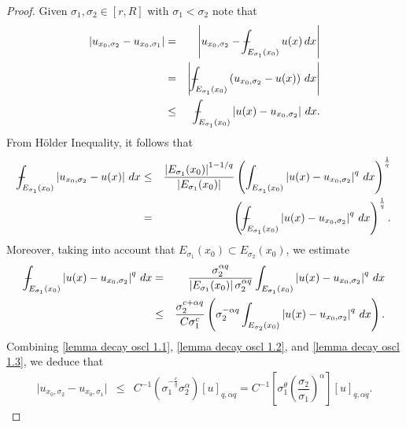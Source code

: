 \documentclass[10pt, leqno]{article}
\def\Xint#1{\mathchoice
{\XXint\displaystyle\textstyle{#1}}
{\XXint\textstyle\scriptstyle{#1}}
{\XXint\scriptstyle\scriptscriptstyle{#1}}
{\XXint\scriptscriptstyle\scriptscriptstyle{#1}}
\!\int}
\def\XXint#1#2#3{{\setbox0=\hbox{$#1{#2#3}{\int}$ }
\vcenter{\hbox{$#2#3$ }}\kern-.6\wd0}}
\def\dashint{\Xint-}
\theoremstyle{definition}
\theoremstyle{remark}
\numberwithin{equation}{section}
\begin{document}
\begin{proof}
Given $\sigma_{1}, \sigma_{2} \in \left [r, R \right]$ with $\sigma_{1} < \sigma_{2}$ note that
\begin{eqnarray}
\label{lemma decay oscl 1.1}
\vert u_{x_{0}, \sigma_{2}} - u_{x_{0}, \sigma_{1}} \vert & = & \nonumber \left | u_{x_{0}, \sigma_{2}} - \displaystyle \dashint_{E_{\sigma_{1}}(x_{0})}u(x)\, dx  \right | \\ \nonumber
& = & \left |  \displaystyle \dashint_{E_{\sigma_{1}}(x_{0})} \left( u_{x_{0}, \sigma_{2}} - u(x) \right) \, dx  \right | \\
& \leq & \displaystyle \dashint_{E_{\sigma_{1}}(x_{0})} \left| u(x) - u_{x_{0}, \sigma_{2}} \right| \, dx.
\end{eqnarray}
From H\" older Inequality, it follows that
\begin{eqnarray}
\label{lemma decay oscl 1.2}
\displaystyle \dashint_{E_{\sigma_{1}}(x_{0})} \left| u_{x_{0}, \sigma_{2}} - u(x) \right| \, dx & \leq & \dfrac{\left | E_{\sigma_{1}}(x_{0}) \right |^{1 - 1/q }}{\left | E_{\sigma_{1}}(x_{0}) \right |} \left(\int_{E_{\sigma_{1}}(x_{0})} \left| u(x) - u_{x_{0}, \sigma_{2}} \right |^{q} \, dx \right )^{\frac{1}{q}} \\ \nonumber
& = & \left(\dashint_{E_{\sigma_{1}}(x_{0})} \left| u(x) - u_{x_{0}, \sigma_{2}} \right |^{q} \, dx \right )^{\frac{1}{q}}.
\end{eqnarray}
Moreover, taking into account that $E_{\sigma_{1}}(x_{0}) \subset E_{\sigma_{2}}(x_{0})$, we estimate
\begin{eqnarray}
\label{lemma decay oscl 1.3}
\dashint_{E_{\sigma_{1}}(x_{0})} \left| u(x) - u_{x_{0}, \sigma_{2}} \right |^{q} \, dx & = & \dfrac{\sigma^{\alpha q}_{2}}{\left | E_{\sigma_{1}}(x_{0}) \right |\sigma^{\alpha q}_{2}}\int_{E_{\sigma_{1}}(x_{0})} \left| u(x) - u_{x_{0}, \sigma_{2}} \right |^{q} \, dx \\ \nonumber
& \leq &  \dfrac{\sigma^{c + \alpha q}_{2}}{C\sigma^{c}_{1}}\left( \sigma^{-\alpha q}_{2} \int_{E_{\sigma_{2}}(x_{0})} \left| u(x) - u_{x_{0}, \sigma_{2}} \right |^{q} \, dx \right).
\end{eqnarray}
Combining \eqref{lemma decay oscl 1.1}, \eqref{lemma decay oscl 1.2}, and \eqref{lemma decay oscl 1.3}, we deduce that
\begin{eqnarray}
\label{lemma decay oscl 1}
\vert u_{x_{0}, \sigma_{2}} - u_{x_{0}, \sigma_{1}} \vert & \leq & C^{-1} \left( \sigma^{-\frac{c}{q}}_{1}\sigma^{\alpha}_{2}\right) \left[ u \right]_{q, \alpha q} = C^{-1} \left[ \sigma^{\theta}_{1}\left(\dfrac{\sigma_{2}}{\sigma_{1}}\right)^{\alpha} \right] \left[ u \right]_{q, \alpha q}.

\end{eqnarray}
\end{proof}
\end{document}
